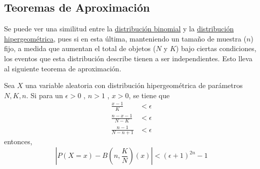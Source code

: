 \subsection{Teoremas de Aproximación}
Se puede ver una similitud entre la \hyperref[dist:binom]{distribución binomial}
y la \hyperref[dist:hip]{distribución hipergeométrica}, pues si en esta última, manteniendo
un tamaño de muestra ($n$) fijo, a medida que aumentan el total de objetos ($N$ y $K$) bajo
ciertas condiciones, los eventos que esta distribución describe tienen a ser independientes.
Esto lleva al siguiente teorema de aproximación.

\begin{Teo}
  Sea $X$ una variable aleatoria con distribución hipergeométrica de
  parámetros $N,K,n$. Si para un $\epsilon>0$ , $n > 1$ , $x > 0$,
  se tiene que
  \begin{align*}
    \frac{x-1}{K}     &< \epsilon\\
    \frac{n-x-1}{N-K} &< \epsilon\\
    \frac{n-1}{N - n + 1}     &< \epsilon
  \end{align*}
  entonces,
  \[\left|P(X=x) - B\left(n,\frac{K}{N}\right)(x)\right| < (\epsilon + 1)^{2n} - 1\]
\end{Teo}

